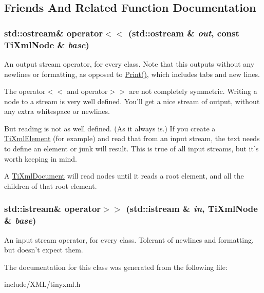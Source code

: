 \subsection{Friends And Related Function Documentation}
\hypertarget{class_ti_xml_node_a86cd49cfb17a844c0010b3136ac966c7}{
\subsubsection[{operator$<$$<$}]{\setlength{\rightskip}{0pt plus 5cm}std::ostream\& operator$<$$<$ (std::ostream \& {\em out}, \/  const {\bf TiXmlNode} \& {\em base})}}
\label{class_ti_xml_node_a86cd49cfb17a844c0010b3136ac966c7}
An output stream operator, for every class. Note that this outputs without any newlines or formatting, as opposed to \hyperlink{class_ti_xml_base_a0de56b3f2ef14c65091a3b916437b512}{Print()}, which includes tabs and new lines.

The operator$<$$<$ and operator$>$$>$ are not completely symmetric. Writing a node to a stream is very well defined. You'll get a nice stream of output, without any extra whitespace or newlines.

But reading is not as well defined. (As it always is.) If you create a \hyperlink{class_ti_xml_element}{TiXmlElement} (for example) and read that from an input stream, the text needs to define an element or junk will result. This is true of all input streams, but it's worth keeping in mind.

A \hyperlink{class_ti_xml_document}{TiXmlDocument} will read nodes until it reads a root element, and all the children of that root element. \hypertarget{class_ti_xml_node_ab57bd426563c926844f65a78412e18b9}{
\subsubsection[{operator$>$$>$}]{\setlength{\rightskip}{0pt plus 5cm}std::istream\& operator$>$$>$ (std::istream \& {\em in}, \/  {\bf TiXmlNode} \& {\em base})}}
\label{class_ti_xml_node_ab57bd426563c926844f65a78412e18b9}
An input stream operator, for every class. Tolerant of newlines and formatting, but doesn't expect them. 

The documentation for this class was generated from the following file:\begin{DoxyCompactItemize}
\item 
include/XML/tinyxml.h\end{DoxyCompactItemize}
